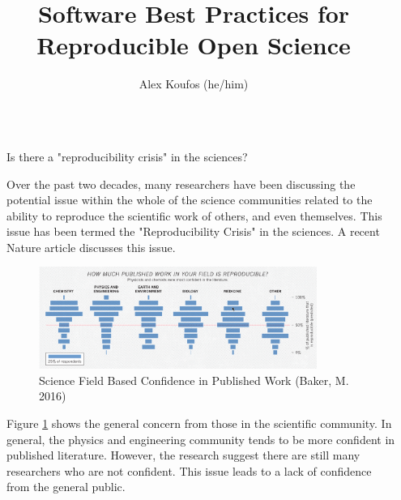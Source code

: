 \documentclass[final]{beamer}
\title{Software Best Practices for Reproducible Open Science}
\author{Alex Koufos (he/him)\inst{1}} %
\institute[shortinst]{\inst{1} Stanford University}
\newlength{\sepwidth}
\newlength{\colwidth}
\newcommand{\separatorcolumn}{\begin{column}{\sepwidth}\end{column}}
\begin{document}
\begin{frame}[t]
\begin{columns}[t]
\separatorcolumn

\begin{column}{\colwidth}

  \begin{block}{Is there a "reproducibility crisis" in the sciences?}

    Over the past two decades, many researchers have been discussing the
    potential issue within the whole of the science communities related to the
    ability to reproduce the scientific work of others, and even themselves.
    This issue has been termed the "Reproducibility Crisis" in the sciences.
    A recent Nature article\cite{baker2016} discusses this issue.
       
    \begin{figure}
      \centering
      \includegraphics[width=0.85\textwidth]{tess2024/Nature-Field-Confidence.png}
      \caption{Science Field Based Confidence in Published Work (Baker, M. 2016)}
      \label{fig:confidence}
    \end{figure}

    Figure \ref*{fig:confidence} shows the general concern from those in the
    scientific community.
    In general, the physics and engineering community tends to be more
    confident in published literature.
    However, the research suggest there are still many researchers who are not
    confident.
    This issue leads to a lack of confidence from the general public.


\end{block}
\end{column}
\end{columns}
\end{frame}
\end{document}
